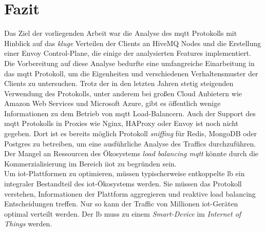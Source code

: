 \section{Fazit}
Das Ziel der vorliegenden Arbeit war die Analyse des \ac{mqtt} Protokolls mit Hinblick auf das \textit{kluge} Verteilen der Clients an HiveMQ Nodes und die Erstellung einer Envoy Control-Plane, die einige der analysierten Features implementiert.
\\
Die Vorbereitung auf diese Analyse bedurfte eine umfangreiche Einarbeitung in das \ac{mqtt} Protokoll, um die Eigenheiten und verschiedenen Verhaltensmuster der Clients zu untersuchen.
Trotz der in den letzten Jahren stetig steigenden Verwendung des Protokolls, unter anderem bei gro{\ss}en Cloud Anbietern wie Amazon Web Services und Microsoft Azure, gibt es öffentlich wenige Informationen zu dem Betrieb von \ac{mqtt} Load-Balancern.
Auch der Support des \ac{mqtt} Protokolls in Proxies wie Nginx, HAProxy oder Envoy ist noch nicht gegeben. Dort ist es bereits möglich Protokoll \textit{sniffing} für Redis, MongoDB oder Postgres zu betreiben, um eine ausführliche Analyse des Traffics durchzuführen.
Der Mangel an Ressourcen des Ökosystems \textit{load balancing \ac{mqtt}} könnte durch die Kommerzialisierung im Bereich \ac{iiot} zu begründen sein.
\\
Um \ac{iot}-Plattformen zu optimieren, müssen typischerweise entkoppelte \acl{lb} ein integraler Bestandteil des \ac{iot}-Ökosystems werden. Sie müssen das Protokoll verstehen, Informationen der Plattform aggregieren und reaktive load balancing Entscheidungen treffen.
Nur so kann der Traffic von Millionen \ac{iot}-Geräten optimal verteilt werden.
Der \acl{lb} muss zu einem \textit{Smart-Device} im \textit{Internet of Things} werden.
\newpage

